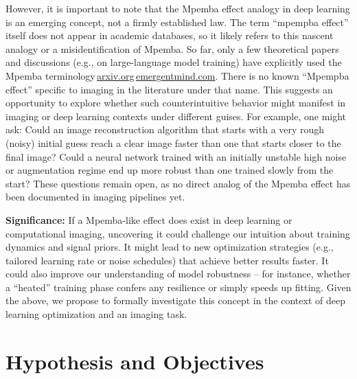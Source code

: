\documentclass[11pt]{article}
\begin{document}
However, it is important to note that the Mpemba effect analogy in deep learning is an emerging concept, not a firmly established law. The term ``mpempba effect'' itself does not appear in academic databases, so it likely refers to this nascent analogy or a misidentification of Mpemba. So far, only a few theoretical papers and discussions (e.g., on large-language model training) have explicitly used the Mpemba terminology\,\href{https://arxiv.org/html/2507.04206v1#:~:text=and the choice of plateau,exists an optimal plateau learning}{arxiv.org}\,\href{https://www.emergentmind.com/topics/warmup-stable-decay-wsd-schedules#:~:text=Notably%2C the greatest loss reduction,May 2025 %2C  25}{emergentmind.com}. There is no known ``Mpempba effect'' specific to imaging in the literature under that name. This suggests an opportunity to explore whether such counterintuitive behavior might manifest in imaging or deep learning contexts under different guises. For example, one might ask: Could an image reconstruction algorithm that starts with a very rough (noisy) initial guess reach a clear image faster than one that starts closer to the final image? Could a neural network trained with an initially unstable high noise or augmentation regime end up more robust than one trained slowly from the start? These questions remain open, as no direct analog of the Mpemba effect has been documented in imaging pipelines yet.

\textbf{Significance:} If a Mpemba-like effect does exist in deep learning or computational imaging, uncovering it could challenge our intuition about training dynamics and signal priors. It might lead to new optimization strategies (e.g., tailored learning rate or noise schedules) that achieve better results faster. It could also improve our understanding of model robustness -- for instance, whether a ``heated'' training phase confers any resilience or simply speeds up fitting. Given the above, we propose to formally investigate this concept in the context of deep learning optimization and an imaging task.

\section{Hypothesis and Objectives}
\end{document}
